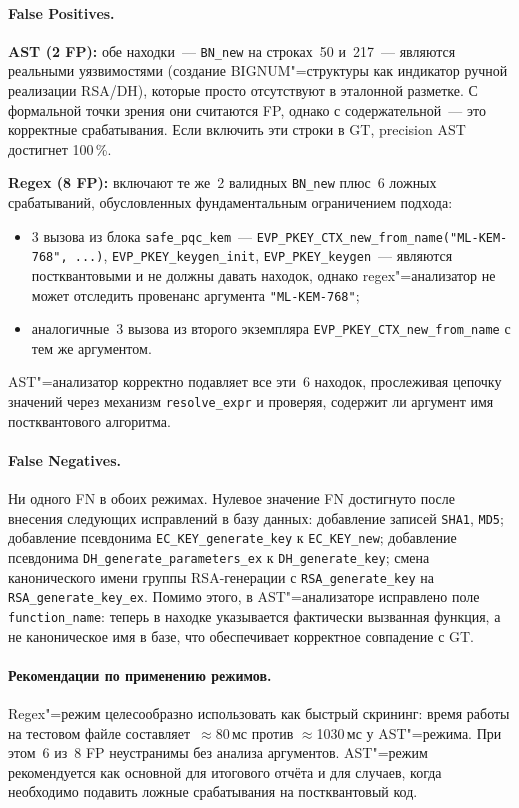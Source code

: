 \paragraph{False Positives.}
\textbf{AST (2 FP):} обе находки~--- \texttt{BN\_new} на строках~50 и~217~---
являются реальными уязвимостями (создание BIGNUM"=структуры как индикатор
ручной реализации RSA/DH), которые просто отсутствуют в эталонной разметке.
С формальной точки зрения они считаются FP, однако с содержательной~---
это корректные срабатывания.
Если включить эти строки в GT, precision AST достигнет 100\,\%.

\textbf{Regex (8 FP):} включают те же~2 валидных \texttt{BN\_new} плюс~6
ложных срабатываний, обусловленных фундаментальным ограничением подхода:
\begin{itemize}
  \item 3 вызова из блока \texttt{safe\_pqc\_kem}~---
        \texttt{EVP\_PKEY\_CTX\_new\_from\_name("ML-KEM-768", ...)},
        \texttt{EVP\_PKEY\_keygen\_init}, \texttt{EVP\_PKEY\_keygen}~---
        являются постквантовыми и не должны давать находок, однако
        regex"=анализатор не может отследить провенанс аргумента
        \texttt{"ML-KEM-768"};
  \item аналогичные~3 вызова из второго экземпляра \texttt{EVP\_PKEY\_CTX\_new\_from\_name}
        с тем же аргументом.
\end{itemize}
AST"=анализатор корректно подавляет все эти~6 находок, прослеживая цепочку
значений через механизм \texttt{resolve\_expr} и проверяя, содержит ли
аргумент имя постквантового алгоритма.

\paragraph{False Negatives.}
Ни одного FN в обоих режимах.
Нулевое значение FN достигнуто после внесения следующих исправлений в
базу данных:
добавление записей \texttt{SHA1}, \texttt{MD5};
добавление псевдонима \texttt{EC\_KEY\_generate\_key} к \texttt{EC\_KEY\_new};
добавление псевдонима \texttt{DH\_generate\_parameters\_ex} к \texttt{DH\_generate\_key};
смена канонического имени группы RSA-генерации с \texttt{RSA\_generate\_key}
на \texttt{RSA\_generate\_key\_ex}.
Помимо этого, в AST"=анализаторе исправлено поле \texttt{function\_name}:
теперь в находке указывается фактически вызванная функция, а не
каноническое имя в базе, что обеспечивает корректное совпадение с GT.

\paragraph{Рекомендации по применению режимов.}
Regex"=режим целесообразно использовать как быстрый скрининг: время
работы на тестовом файле составляет~$\approx$80\,мс против
$\approx$1030\,мс у AST"=режима.
При этом~6 из~8 FP неустранимы без анализа аргументов.
AST"=режим рекомендуется как основной для итогового отчёта и
для случаев, когда необходимо подавить ложные срабатывания на
постквантовый код.

